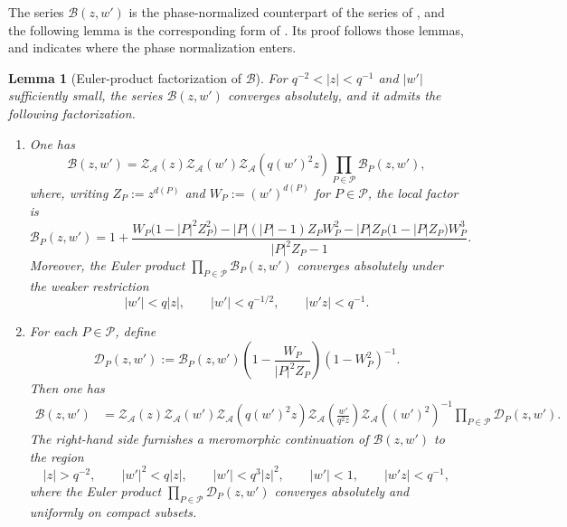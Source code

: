 \documentclass[a4paper,reqno]{amsart}
\numberwithin{equation}{section}
\newtheorem{lemma}[theorem]{Lemma}
\theoremstyle{remark}
\theoremstyle{definition}
\newcommand{\A}{\mathcal{A}}
\begin{document}
The series $\mathcal B(z,w')$ is the
phase-normalized counterpart of the series of \cite[Lemma~6.2]{Fl17-1}, and
the following lemma is the corresponding form of
\cite[Lemmas~6.2--6.3]{Fl17-1}. Its proof follows those lemmas, and
indicates where the phase normalization enters.

\begin{lemma}[Euler-product factorization of $\mathcal B$]\label{lem:B}
For $q^{-2}<|z|<q^{-1}$ and $|w'|$ sufficiently small, the series
$\mathcal B(z,w')$ converges absolutely, and it admits the following
factorization.

\begin{enumerate}[label=\textup{(\arabic*)}]
\item
One has
\begin{equation}\label{eq:B-factorization}
\mathcal{B}(z,w')
=
\mathcal Z_{\A}(z)
\mathcal Z_{\A}(w')
\mathcal Z_{\A}(q(w')^2z)
\prod_{P\in\mathcal P}\mathcal{B}_P(z,w'),
\end{equation}
where, writing
$Z_P:=z^{d(P)}$ and $W_P:=(w')^{d(P)}$ for $P\in\mathcal P$,
the local factor is
\begin{equation}\label{eq:BP}
\mathcal B_P(z,w')
=
1+
\frac{
W_P\bigl(1-|P|^2Z_P^2\bigr)
-|P|(|P|-1)Z_PW_P^2
-|P|Z_P\bigl(1-|P|Z_P\bigr)W_P^3
}{
|P|^2Z_P-1
}.
\end{equation}
Moreover, the Euler product
$\prod_{P\in\mathcal P}\mathcal B_P(z,w')$
converges absolutely under the weaker restriction
\begin{equation}\label{eq:B-region}
|w'|<q|z|,
\qquad
|w'|<q^{-1/2},
\qquad
|w'z|<q^{-1}.
\end{equation}

\item
For each $P\in\mathcal P$, define
\begin{equation}\label{eq:DP}
\mathcal D_P(z,w')
:=
\mathcal B_P(z,w')
\left(
1-\frac{W_P}{|P|^2Z_P}
\right)
(1-W_P^2)^{-1}.
\end{equation}
Then one has
\begin{align}\label{eq:B-continuation}
\mathcal{B}(z,w')
&=
\mathcal Z_{\A}(z)
\mathcal Z_{\A}(w')
\mathcal Z_{\A}(q(w')^2z)
\mathcal Z_{\A}\!\left(\frac{w'}{q^2z}\right)
\mathcal Z_{\A}((w')^2)^{-1}
\prod_{P\in\mathcal P}\mathcal{D}_P(z,w').
\end{align}
The right-hand side furnishes a meromorphic continuation of $\mathcal{B}(z,w')$
to the region
\begin{equation}\label{eq:D-region}
|z|>q^{-2},
\qquad
|w'|^2<q|z|,
\qquad
|w'|<q^3|z|^2,
\qquad
|w'|<1,
\qquad
|w'z|<q^{-1},
\end{equation}
where the Euler product
$\prod_{P\in\mathcal P}\mathcal{D}_P(z,w')$
converges absolutely and uniformly on compact subsets.
\end{enumerate}
\end{lemma}
\end{document}
